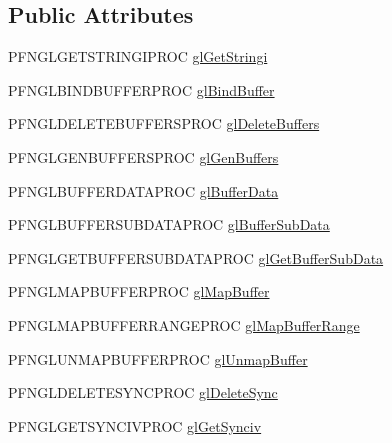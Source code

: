 \subsection*{Public Attributes}
\begin{DoxyCompactItemize}
\item 
P\+F\+N\+G\+L\+G\+E\+T\+S\+T\+R\+I\+N\+G\+I\+P\+R\+O\+C \hyperlink{class_agmd_1_1_g_l_context_ad9ff6a71ef0a1a908fcd5309b6ea28c9}{gl\+Get\+Stringi}
\item 
P\+F\+N\+G\+L\+B\+I\+N\+D\+B\+U\+F\+F\+E\+R\+P\+R\+O\+C \hyperlink{class_agmd_1_1_g_l_context_af23d3cf9cba04fd877430f4976a0776c}{gl\+Bind\+Buffer}
\item 
P\+F\+N\+G\+L\+D\+E\+L\+E\+T\+E\+B\+U\+F\+F\+E\+R\+S\+P\+R\+O\+C \hyperlink{class_agmd_1_1_g_l_context_af84e04cf6aa26abc9890c9378fa97184}{gl\+Delete\+Buffers}
\item 
P\+F\+N\+G\+L\+G\+E\+N\+B\+U\+F\+F\+E\+R\+S\+P\+R\+O\+C \hyperlink{class_agmd_1_1_g_l_context_acfe1b0004959d901387807fc288a61ea}{gl\+Gen\+Buffers}
\item 
P\+F\+N\+G\+L\+B\+U\+F\+F\+E\+R\+D\+A\+T\+A\+P\+R\+O\+C \hyperlink{class_agmd_1_1_g_l_context_a28c949792cccb39ac07f3f827ebf8665}{gl\+Buffer\+Data}
\item 
P\+F\+N\+G\+L\+B\+U\+F\+F\+E\+R\+S\+U\+B\+D\+A\+T\+A\+P\+R\+O\+C \hyperlink{class_agmd_1_1_g_l_context_a0e5af02bed1d14c9be0ffdb3868d7a8c}{gl\+Buffer\+Sub\+Data}
\item 
P\+F\+N\+G\+L\+G\+E\+T\+B\+U\+F\+F\+E\+R\+S\+U\+B\+D\+A\+T\+A\+P\+R\+O\+C \hyperlink{class_agmd_1_1_g_l_context_a40bccbce46e467349535cbf323cf67a3}{gl\+Get\+Buffer\+Sub\+Data}
\item 
P\+F\+N\+G\+L\+M\+A\+P\+B\+U\+F\+F\+E\+R\+P\+R\+O\+C \hyperlink{class_agmd_1_1_g_l_context_a3ac84f7541289057ed6e3af0905263cc}{gl\+Map\+Buffer}
\item 
P\+F\+N\+G\+L\+M\+A\+P\+B\+U\+F\+F\+E\+R\+R\+A\+N\+G\+E\+P\+R\+O\+C \hyperlink{class_agmd_1_1_g_l_context_a5f026cca730a0d1aff95a9969af00b25}{gl\+Map\+Buffer\+Range}
\item 
P\+F\+N\+G\+L\+U\+N\+M\+A\+P\+B\+U\+F\+F\+E\+R\+P\+R\+O\+C \hyperlink{class_agmd_1_1_g_l_context_a838ea62e676084d1bbabde5441eac147}{gl\+Unmap\+Buffer}
\item 
P\+F\+N\+G\+L\+D\+E\+L\+E\+T\+E\+S\+Y\+N\+C\+P\+R\+O\+C \hyperlink{class_agmd_1_1_g_l_context_a92c421af0cca95efe78bcaf44c327203}{gl\+Delete\+Sync}
\item 
P\+F\+N\+G\+L\+G\+E\+T\+S\+Y\+N\+C\+I\+V\+P\+R\+O\+C \hyperlink{class_agmd_1_1_g_l_context_a6ebd7130d68d5d657ee217fcfc706bf9}{gl\+Get\+Synciv}

\end{DoxyCompactItemize}
